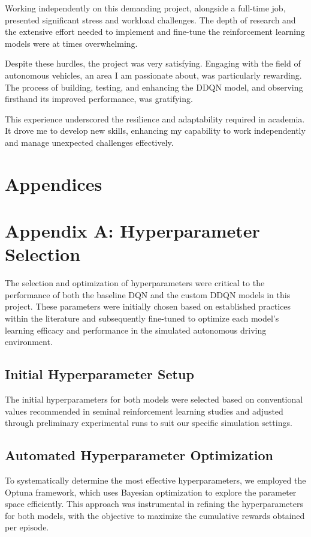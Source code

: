 \documentclass{article}
\begin{document}
Working independently on this demanding project, alongside a full-time job, presented significant stress and workload challenges. The depth of research and the extensive effort needed to implement and fine-tune the reinforcement learning models were at times overwhelming.

Despite these hurdles, the project was very satisfying. Engaging with the field of autonomous vehicles, an area I am passionate about, was particularly rewarding. The process of building, testing, and enhancing the DDQN model, and observing firsthand its improved performance, was gratifying.

This experience underscored the resilience and adaptability required in academia. It drove me to develop new skills, enhancing my capability to work independently and manage unexpected challenges effectively.

\small


\normalsize
\newpage
\section*{Appendices}
\section*{Appendix A: Hyperparameter Selection}

The selection and optimization of hyperparameters were critical to the performance of both the baseline DQN and the custom DDQN models in this project. These parameters were initially chosen based on established practices within the literature and subsequently fine-tuned to optimize each model's learning efficacy and performance in the simulated autonomous driving environment.

\subsection*{Initial Hyperparameter Setup}
The initial hyperparameters for both models were selected based on conventional values recommended in seminal reinforcement learning studies and adjusted through preliminary experimental runs to suit our specific simulation settings.

\subsection*{Automated Hyperparameter Optimization}
To systematically determine the most effective hyperparameters, we employed the Optuna framework, which uses Bayesian optimization to explore the parameter space efficiently. This approach was instrumental in refining the hyperparameters for both models, with the objective to maximize the cumulative rewards obtained per episode.
\end{document}

